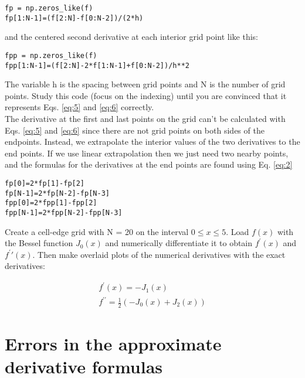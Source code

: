 \begin{lstlisting}
fp = np.zeros_like(f)
fp[1:N-1]=(f[2:N]-f[0:N-2])/(2*h)
\end{lstlisting}
and the centered second derivative at each interior grid point like this:
\begin{lstlisting}
fpp = np.zeros_like(f) 
fpp[1:N-1]=(f[2:N]-2*f[1:N-1]+f[0:N-2])/h**2
\end{lstlisting}

The variable h is the spacing between grid points and N is the number of grid points. Study this code (focus on the indexing) until you are convinced that it represents Eqs. \eqref{eq:5} and \eqref{eq:6} correctly. \\The derivative at the first and last points on the grid can\rq t be calculated with Eqs.  \eqref{eq:5} and \eqref{eq:6} since there are not grid points on both sides of the endpoints. Instead, we extrapolate the interior values of the two derivatives to the end points. If we use linear extrapolation then we just need two nearby points, and the formulas for the derivatives at the end points are found using Eq. \eqref{eq:2}
\begin{lstlisting}
fp[0]=2*fp[1]-fp[2] 
fp[N-1]=2*fp[N-2]-fp[N-3] 
fpp[0]=2*fpp[1]-fpp[2] 
fpp[N-1]=2*fpp[N-2]-fpp[N-3]
\end{lstlisting}

\begin{problem} \label{P1.4}
Create a cell-edge grid with N = 20 on the interval $0 \leq x \leq 5$. Load $f(x)$ with the Bessel function $J_0(x)$ and numerically differentiate it to obtain $f^\prime(x)$ and $f^\prime\prime(x)$. Then make overlaid plots of the numerical derivatives with the exact derivatives:
\end{problem}

\begin{equation*}
\begin{split}
			f^\prime(x) = -J_1(x)\\
			f^{\prime\prime} = \frac{1}{2}(-J_0(x)+J_2(x))	
			\end{split}
\end{equation*}

\section*{Errors in the approximate derivative formulas}


